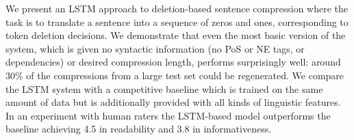 We present an LSTM approach to deletion-based sentence compression where the task is to translate a sentence into a sequence of zeros and ones, corresponding to token deletion decisions. We demonstrate that even the most basic version of the system, which is given no syntactic information (no PoS or NE tags, or dependencies) or desired compression length, performs surprisingly well: around 30\% of the compressions from a large test set could be regenerated. We compare the LSTM system with a competitive baseline which is trained on the same amount of data but is additionally provided with all kinds of linguistic features. In an experiment with human raters the LSTM-based model outperforms the baseline achieving 4.5 in readability and 3.8 in informativeness.
